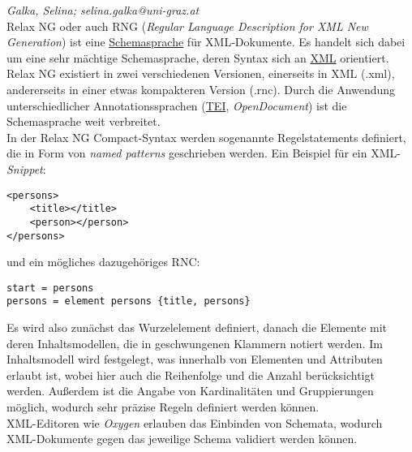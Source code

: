 \documentclass{article}
\begin{document}
\emph{Galka, Selina; selina.galka@uni-graz.at }\\
        
    Relax NG oder auch RNG (\emph{Regular Language Description for XML New
                     Generation}) ist eine \href{http://gams.uni-graz.at/o:konde.166}{Schemasprache} für XML-Dokumente. Es handelt sich dabei um eine sehr
                  mächtige Schemasprache, deren Syntax sich an \href{http://gams.uni-graz.at/o:konde.215}{XML} orientiert. Relax NG existiert in zwei
                  verschiedenen Versionen, einerseits in XML (.xml), andererseits in einer etwas
                  kompakteren Version (.rnc). Durch die Anwendung unterschiedlicher
                  Annotationssprachen (\href{http://gams.uni-graz.at/o:konde.178}{TEI}, \emph{OpenDocument}) ist die Schemasprache weit verbreitet.\\
            
        In der Relax NG Compact-Syntax werden sogenannte Regelstatements definiert, die in
                  Form von \emph{named patterns} geschrieben werden. Ein Beispiel
                  für ein XML-\emph{Snippet}:\\
            
        \begin{verbatim}<persons>
    <title></title>
    <person></person>
</persons>\end{verbatim}und ein mögliches dazugehöriges RNC:\\
            
        \begin{verbatim}start = persons
persons = element persons {title, persons}\end{verbatim}Es wird also zunächst das Wurzelelement definiert, danach die Elemente mit deren
                  Inhaltsmodellen, die in geschwungenen Klammern notiert werden. Im Inhaltsmodell
                  wird festgelegt, was innerhalb von Elementen und Attributen erlaubt ist, wobei
                  hier auch die Reihenfolge und die Anzahl berücksichtigt werden. Außerdem ist die
                  Angabe von Kardinalitäten und Gruppierungen möglich, wodurch sehr präzise Regeln
                  definiert werden können.\\
            
        XML-Editoren wie \emph{Oxygen} erlauben das Einbinden von
                  Schemata, wodurch XML-Dokumente gegen das jeweilige Schema validiert werden
                  können.\\
            
\end{document}
